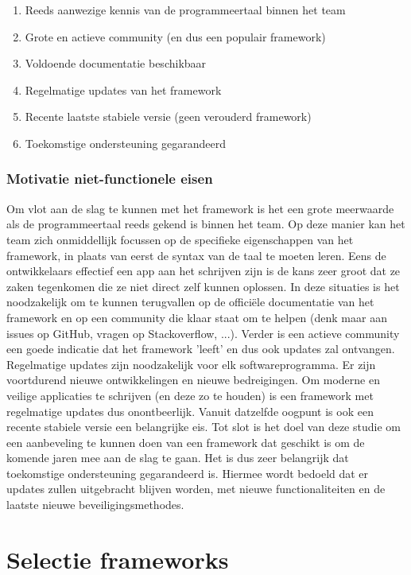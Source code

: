 \begin{enumerate}
    \item Reeds aanwezige kennis van de programmeertaal binnen het team
    \item Grote en actieve community (en dus een populair framework)
    \item Voldoende documentatie beschikbaar
    \item Regelmatige updates van het framework
    \item Recente laatste stabiele versie (geen verouderd framework)
    \item Toekomstige ondersteuning gegarandeerd    
\end{enumerate}

\subsubsection{Motivatie niet-functionele eisen}
\label{subsubsec:MotivatieNietFuntioneleEisen}

Om vlot aan de slag te kunnen met het framework is het een grote meerwaarde als de programmeertaal reeds gekend is binnen het team. Op deze manier kan het team zich onmiddellijk focussen op de specifieke eigenschappen van het framework, in plaats van eerst de syntax van de taal te moeten leren. Eens de ontwikkelaars effectief een app aan het schrijven zijn is de kans zeer groot dat ze zaken tegenkomen die ze niet direct zelf kunnen oplossen. In deze situaties is het noodzakelijk om te kunnen terugvallen op de officiële documentatie van het framework en op een community die klaar staat om te helpen (denk maar aan issues op GitHub, vragen op Stackoverflow, ...). Verder is een actieve community een goede indicatie dat het framework 'leeft' en dus ook updates zal ontvangen. Regelmatige updates zijn noodzakelijk voor elk softwareprogramma. Er zijn voortdurend nieuwe ontwikkelingen en nieuwe bedreigingen. Om moderne en veilige applicaties te schrijven (en deze zo te houden) is een framework met regelmatige updates dus onontbeerlijk. Vanuit datzelfde oogpunt is ook een recente stabiele versie een belangrijke eis. Tot slot is het doel van deze studie om een aanbeveling te kunnen doen van een framework dat geschikt is om de komende jaren mee aan de slag te gaan. Het is dus zeer belangrijk dat toekomstige ondersteuning gegarandeerd is. Hiermee wordt bedoeld dat er updates zullen uitgebracht blijven worden, met nieuwe functionaliteiten en de laatste nieuwe beveiligingsmethodes.

\section{Selectie frameworks}
\label{sec:selectieFrameworks}

